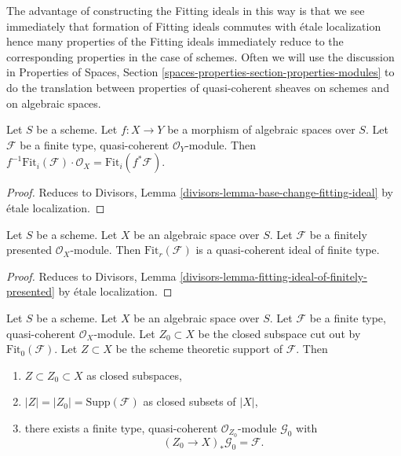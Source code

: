 \medskip\noindent
The advantage of constructing the Fitting ideals in this way
is that we see immediately that formation of Fitting ideals
commutes with \'etale localization hence many properties of
the Fitting ideals immediately reduce to the corresponding
properties in the case of schemes. Often we will use the
discussion in Properties of Spaces, Section
\ref{spaces-properties-section-properties-modules}
to do the translation between properties of quasi-coherent sheaves
on schemes and on algebraic spaces.

\begin{lemma}
\label{lemma-base-change-fitting-ideal}
Let $S$ be a scheme.
Let $f : X \to Y$ be a morphism of algebraic spaces over $S$.
Let $\mathcal{F}$ be a finite type, quasi-coherent $\mathcal{O}_Y$-module.
Then
$f^{-1}\text{Fit}_i(\mathcal{F}) \cdot \mathcal{O}_X =
\text{Fit}_i(f^*\mathcal{F})$.
\end{lemma}

\begin{proof}
Reduces to
Divisors, Lemma \ref{divisors-lemma-base-change-fitting-ideal}
by \'etale localization.
\end{proof}

\begin{lemma}
\label{lemma-fitting-ideal-of-finitely-presented}
Let $S$ be a scheme. Let $X$ be an algebraic space over $S$.
Let $\mathcal{F}$ be a finitely presented $\mathcal{O}_X$-module.
Then $\text{Fit}_r(\mathcal{F})$ is a quasi-coherent ideal of finite type.
\end{lemma}

\begin{proof}
Reduces to
Divisors, Lemma \ref{divisors-lemma-fitting-ideal-of-finitely-presented}
by \'etale localization.
\end{proof}

\begin{lemma}
\label{lemma-on-subscheme-cut-out-by-Fit-0}
Let $S$ be a scheme. Let $X$ be an algebraic space over $S$.
Let $\mathcal{F}$ be a finite type, quasi-coherent $\mathcal{O}_X$-module.
Let $Z_0 \subset X$ be the closed subspace cut out by
$\text{Fit}_0(\mathcal{F})$.
Let $Z \subset X$ be the scheme theoretic support of $\mathcal{F}$.
Then
\begin{enumerate}
\item $Z \subset Z_0 \subset X$ as closed subspaces,
\item $|Z| = |Z_0| = \text{Supp}(\mathcal{F})$ as closed subsets of $|X|$,
\item there exists a finite type, quasi-coherent $\mathcal{O}_{Z_0}$-module
$\mathcal{G}_0$ with
$$
(Z_0 \to X)_*\mathcal{G}_0 = \mathcal{F}.
$$
\end{enumerate}
\end{lemma}

